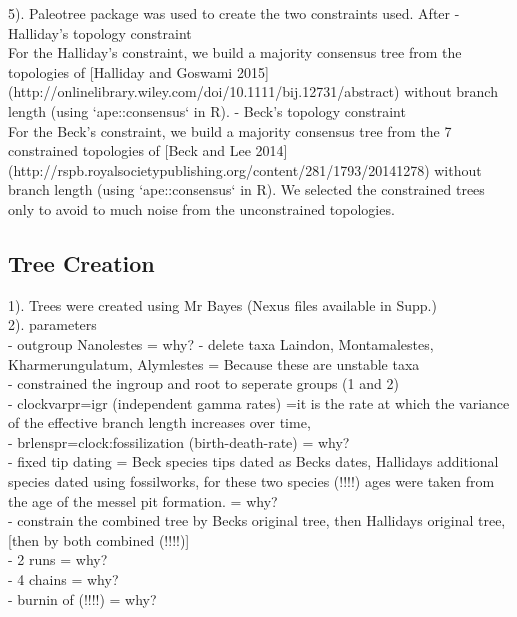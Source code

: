 \documentclass[a4paper,11pt]{article}
\begin{document}
 5). Paleotree package was used to create the two constraints used. After %
 - Halliday's topology constraint\\
For the Halliday's constraint, we build a majority consensus tree from the topologies of [Halliday and Goswami 2015]\\ (http://onlinelibrary.wiley.com/doi/10.1111/bij.12731/abstract) without branch length (using `ape::consensus` in R).
 - Beck's topology constraint\\
For the Beck's constraint, we build a majority consensus tree from the 7 constrained topologies of [Beck and Lee 2014]\\ (http://rspb.royalsocietypublishing.org/content/281/1793/20141278) without branch length (using `ape::consensus` in R).
We selected the constrained trees only to avoid to much noise from the unconstrained topologies.

\subsection{Tree Creation}

1). Trees were created using Mr Bayes (Nexus files available in Supp.)\\

2). parameters\\
- outgroup Nanolestes = why? %
- delete taxa Laindon, Montamalestes, Kharmerungulatum, Alymlestes = Because these are unstable taxa\\
- constrained the ingroup and root to seperate groups (1 and 2)\\ %
- clockvarpr=igr (independent gamma rates) =it is the rate at which the variance of the effective branch length increases over time,\\
- brlenspr=clock:fossilization (birth-death-rate) = why?\\ %
- fixed tip dating = Beck species tips dated as Becks dates, Hallidays additional species dated using fossilworks, for these two species (!!!!) ages were taken from the age of the messel pit formation. = why?\\
- constrain the combined tree by Becks original tree, then Hallidays original tree, [then by both combined (!!!!)]\\
- 2 runs = why?\\
- 4 chains = why?\\
- burnin of (!!!!) = why?\\
\end{document}
